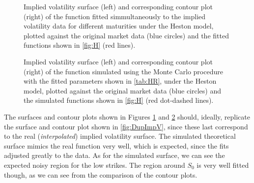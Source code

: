 \begin{figure}[H]
  \begin{subfigmatrix}{2}
  \end{subfigmatrix}
    \caption[Implied volatility surface and corresponding contour plot of the function fitted simmultaneously to the implied volatility data for different maturities under the Heston model, plotted against the original market data and the fitted functions shown in \autoref{fig:H}.]{Implied volatility surface (left) and corresponding contour plot (right) of the function fitted simmultaneously to the implied volatility data for different maturities under the Heston model, plotted against the original market data (blue circles) and the fitted functions shown in \autoref{fig:H} (red lines).}\label{fig:HS}
\end{figure}   


\begin{figure}[H]
  \begin{subfigmatrix}{2}
  \end{subfigmatrix}
    \caption[Implied volatility surface and corresponding contour plot of the function simulated using the Monte Carlo procedure with the fitted parameters shown in \autoref{tab:HR}, under the Heston model, plotted against the original market data and the simulated functions shown in \autoref{fig:H}.]{Implied volatility surface (left) and corresponding contour plot (right) of the function simulated using the Monte Carlo procedure with the fitted parameters shown in \autoref{tab:HR}, under the Heston model, plotted against the original market data (blue circles) and the simulated functions shown in \autoref{fig:H} (red dot-dashed lines).}\label{fig:HSSim}
\end{figure} 


The surfaces and contour plots shown in Figures \ref{fig:HS} and \ref{fig:HSSim} should, ideally, replicate the surface and contour plot shown in \autoref{fig:DupImpV}, since these last correspond to the real (\emph{interpolated}) implied volatility surface. The simulated theoretical surface mimics the real function very well, which is expected, since the fits adjusted greatly to the data.
As for the simulated surface, we can see the expected noisy region for the low strikes. The region around $S_0$ is very well fitted though, as we can see from the comparison of the contour plots.


